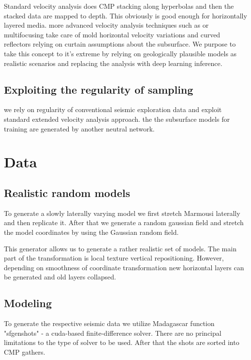 \documentclass[paper,twocolomn]{geophysics}
\begin{document}
Standard velocity analysis does CMP stacking along hyperbolas and then the stacked data are mapped to depth. This obviously is good enough for horizontally layered media. more advanced velocity analysis techniques such as  or multifocusing take care of mold horizontal velocity variations and curved reflectors relying on curtain assumptions about the subsurface. We purpose to take this concept to it's extreme by relying on geologically plausible models as realistic scenarios and replacing the analysis with deep learning inference.

\subsection{Exploiting the regularity of sampling}
we rely on regularity of conventional seismic exploration data and exploit standard extended velocity analysis approach.  the
the subsurface models for training are generated by another neutral network.


\section{Data}


\subsection{Realistic random models}
To generate a slowly laterally varying model we first stretch Marmousi laterally and then replicate it.
% 
After that we generate a random gaussian field and stretch the model coordinates by using the Gaussian random field.

This generator allows us to generate a rather realistic set of models. The main part of the transformation is local texture vertical repositioning. However, depending on smoothness of coordinate transformation new horizontal layers can be generated and old layers collapsed.

\subsection{Modeling}
To generate the respective seismic data we utilize Madagascar function "sfgenshots" - a cuda-based finite-difference solver. There are no principal limitations to the type of solver to be used. After that the shots are sorted into CMP gathers.
\end{document}
